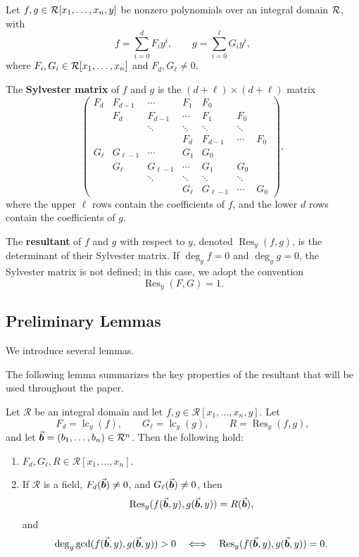 \documentclass{article}
\numberwithin{equation}{section}
\begin{document}
Let $f, g \in {\mathcal{R}}[x_1,\dots,x_n,y]$ be nonzero polynomials over an integral domain ${\mathcal{R}}$, with
\[
f = \sum_{i=0}^{d} F_i y^i, \qquad g = \sum_{i=0}^{\ell} G_i y^i,
\]
where $F_i, G_i \in {\mathcal{R}}[x_1,\dots,x_n]$ and $F_d, G_\ell \neq 0$.

The \textbf{Sylvester matrix} of $f$ and $g$ is the $(d+\ell) \times (d+\ell)$ matrix
\[
\begin{pmatrix}
F_d & F_{d-1} & \cdots & F_1 & F_0 & & \\
    & F_d & F_{d-1} & \cdots & F_1 & F_0 & \\
    & & \ddots & \ddots & \ddots & \ddots & \\
    & & & F_d & F_{d-1} & \cdots & F_0 \\
G_\ell & G_{\ell-1} & \cdots & G_1 & G_0 & & \\
    & G_\ell & G_{\ell-1} & \cdots & G_1 & G_0 & \\
    & & \ddots & \ddots & \ddots & \ddots & \\
    & & & G_\ell & G_{\ell-1} & \cdots & G_0
\end{pmatrix},
\]
where the upper $\ell$ rows contain the coefficients of $f$, and the lower $d$ rows contain the coefficients of $g$.

The \textbf{resultant} of $f$ and $g$ with respect to $y$, denoted $\operatorname{Res}_y(f,g)$, is the determinant of their Sylvester matrix. If $\deg_y f = 0$ and $\deg_y g = 0$, the Sylvester matrix is not defined; in this case, we adopt the convention
\[
\operatorname{Res}_y(F,G) = 1.
\]






\subsection{Preliminary Lemmas}
We introduce several lemmas.

The following lemma summarizes the key properties of the resultant that will be used throughout the paper.

\begin{lemma}\label{lm-resultant}
Let $\mathcal{R}$ be an integral domain and let $f, g \in \mathcal{R}[x_1,\dots,x_n,y]$. Let
\[
F_d = \operatorname{lc}_y(f), \qquad G_\ell = \operatorname{lc}_y(g), \qquad R = \operatorname{Res}_y(f,g),
\]
and let $\vec{\boldsymbol{b}} = (b_1,\dots,b_n) \in \mathcal{R}^n$. Then the following hold:

\begin{enumerate}
    \item $F_d, G_\ell, R \in \mathcal{R}[x_1,\dots,x_n]$.
    \item If $\mathcal{R}$ is a field, $F_d(\vec{\boldsymbol{b}}) \neq 0$, and $G_\ell(\vec{\boldsymbol{b}}) \neq 0$, then
    \[
    \operatorname{Res}_y(f(\vec{\boldsymbol{b}}, y), g(\vec{\boldsymbol{b}}, y)) = R(\vec{\boldsymbol{b}}),
    \]
    and
    \[
    \deg_y \gcd(f(\vec{\boldsymbol{b}}, y), g(\vec{\boldsymbol{b}}, y)) > 0
    \quad \Longleftrightarrow \quad
    \operatorname{Res}_y(f(\vec{\boldsymbol{b}}, y), g(\vec{\boldsymbol{b}}, y)) = 0.
    \]
\end{enumerate}
\end{lemma}
\end{document}
